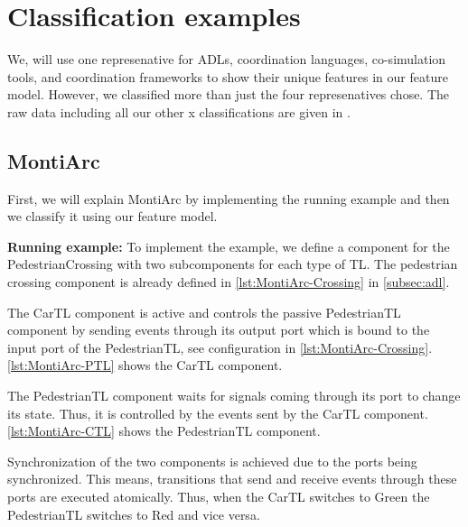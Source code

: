 \documentclass[runningheads]{llncs}
\begin{document}
\section{Classification examples} \label{sec:classifications}
We, will use one represenative for ADLs, coordination languages, co-simulation tools, and coordination frameworks to show their unique features in our feature model.
However, we classified more than just the four represenatives chose.
The raw data including all our other x classifications are given in \cite{krauterCoordination2024Artifacts2024}.

\subsection{MontiArc} \label{subsec:montiArc}
First, we will explain MontiArc by implementing the running example and then we classify it using our feature model.

\textbf{Running example:} To implement the example, we define a component for the \textsf{PedestrianCrossing} with two subcomponents for each type of TL.
The pedestrian crossing component is already defined in \autoref{lst:MontiArc-Crossing} in \autoref{subsec:adl}.

The \textsf{CarTL} component is active and controls the passive \textsf{PedestrianTL} component by sending events through its output port which is bound to the input port of the \textsf{PedestrianTL}, see configuration in \autoref{lst:MontiArc-Crossing}.
\autoref{lst:MontiArc-PTL} shows the \textsf{CarTL} component.



The \textsf{PedestrianTL} component waits for signals coming through its port to change its state.
Thus, it is controlled by the events sent by the \textsf{CarTL} component.
\autoref{lst:MontiArc-CTL} shows the \textsf{PedestrianTL} component.



Synchronization of the two components is achieved due to the ports being synchronized.
This means, transitions that send and receive events through these ports are executed atomically.
Thus, when the \textsf{CarTL} switches to \textsf{Green} the \textsf{PedestrianTL} switches to \textsf{Red} and vice versa.
\end{document}
